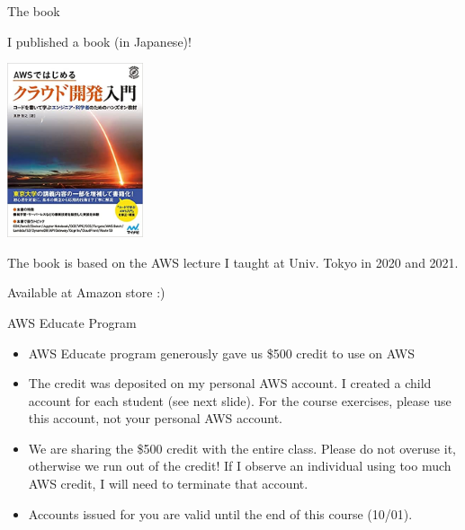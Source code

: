 \documentclass[unicode,11pt]{beamer}
\begin{document}
\begin{frame}{The book}

\centering
I published a book (in Japanese)!

\includegraphics[width=0.3\textwidth]{imgs/book_cover.jpg}

{\small The book is based on the AWS lecture I taught at Univ. Tokyo in 2020 and 2021.}

\vspace{10pt}

Available at Amazon store :)

\end{frame}

\begin{frame}{AWS Educate Program}

\begin{itemize}
    \item AWS Educate program generously gave us \$500 credit to use on AWS
    \item The credit was deposited on my personal AWS account.
    I created a child account for each student (see next slide).
    For the course exercises, please use this account, not your personal AWS account.
    \item We are sharing the \$500 credit with the entire class.
    Please do not overuse it, otherwise we run out of the credit!
    If I observe an individual using too much AWS credit, I will need to terminate that account.
    \item Accounts issued for you are valid until the end of this course (10/01).
\end{itemize}
    
\end{frame}
\end{document}
